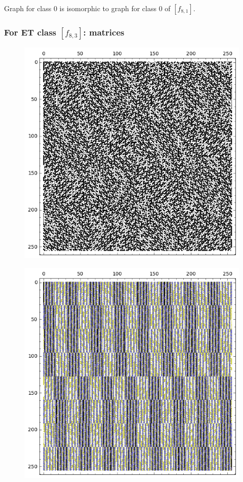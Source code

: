 \documentclass[pdf,sprung,slideColor,nocolorBG]{beamer}
\newenvironment{colortheme}[1]{
\def\ProvidesPackageRCS $##1${\relax}
\renewcommand{\ProcessOptions}{\relax}
\makeatletter

\makeatother
}{}
\begin{document}
\begin{colortheme}{jubata}
\begin{frame}
\begin{figure}
\begin{minipage}{.48\textwidth}
  \label{fig:8_2_bent_cayley_graph_index_matrix}
\end{minipage}
\end{figure}
Graph for class 0 is isomorphic to graph for class 0 of $[f_{8,1}]$.
\end{frame}
\begin{frame}
\frametitle{For ET class $[f_{8,3}]$: matrices}
\begin{figure}
\centering
\begin{minipage}{.48\textwidth}
  \centering
  \includegraphics[width=.9\linewidth]{../matrix_plot/c8_3_weight_class_matrix.png}
  \label{fig:8_3_weight_class_matrix}
\end{minipage}%
\begin{minipage}{.48\textwidth}
  \centering
  \includegraphics[width=.9\linewidth]{../matrix_plot/c8_3_bent_cayley_graph_index_matrix.png}

\end{minipage}
\end{figure}
\end{frame}
\end{colortheme}
\end{document}
